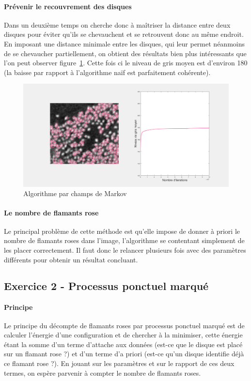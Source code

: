 \documentclass{article}
\begin{document}
\paragraph{Prévenir le recouvrement des disques}
Dans un deuxième temps on cherche donc à maîtriser la distance entre deux disques pour éviter qu'ils se chevauchent et se retrouvent donc au même endroit. En imposant une distance minimale entre les disques, qui leur permet néanmoins de se chevaucher partiellement, on obtient des résultats bien plus intéressants que l'on peut observer figure~\ref{6-markov}. Cette fois ci le niveau de gris moyen est d'environ 180 (la baisse par rapport à l'algorithme naïf est parfaitement cohérente).
\begin{figure}[!ht]
    \centering
    \includegraphics[width=\linewidth]{images/6-markov.png}
    \caption{Algorithme par champs de Markov}
    \label{6-markov}
\end{figure}

\paragraph{Le nombre de flamants rose}
Le principal problème de cette méthode est qu'elle impose de donner à priori le nombre de flamants roses dans l'image, l'algorithme se contentant simplement de les placer correctement. Il faut donc le relancer plusieurs fois avec des paramètres différents pour obtenir un résultat concluant.

\subsection{Exercice 2 - Processus ponctuel marqué}
\paragraph{Principe}
Le principe du décompte de flamants roses par processus ponctuel marqué est de calculer l'énergie d'une configuration et de chercher à la minimiser, cette énergie étant la somme d'un terme d'attache aux données (est-ce que le disque est placé sur un flamant rose ?) et d'un terme d'a priori (est-ce qu'un disque identifie déjà ce flamant rose ?). En jouant sur les paramètres et sur le rapport de ces deux termes, on espère parvenir à compter le nombre de flamants roses.
\end{document}
